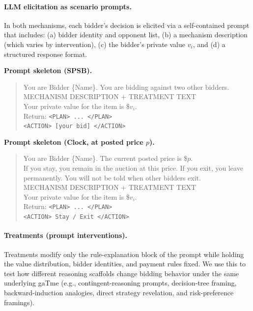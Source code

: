 \documentclass[format=acmsmall, review=false]{acmart}
\begin{document}
\paragraph{LLM elicitation as scenario prompts.}
In both mechanisms, each bidder’s decision is elicited via a self-contained prompt that includes: (a) bidder identity and opponent list, (b) a mechanism description (which varies by intervention), (c) the bidder’s private value $v_i$, and (d) a structured response format.

\vspace{.5cm}
\noindent\textbf{Prompt skeleton (SPSB).}
\begin{quote}\small
You are Bidder \{Name\}. You are bidding against two other bidders.\\
MECHANISM DESCRIPTION + TREATMENT TEXT\\
Your private value for the item is \${$v_i$}.\\
Return:
\texttt{<PLAN> ... </PLAN>}\\
\texttt{<ACTION> [your bid] </ACTION>}
\end{quote}

\noindent\textbf{Prompt skeleton (Clock, at posted price $p$).}
\begin{quote}\small
You are Bidder \{Name\}. The current posted price is \${$p$}.\\
If you stay, you remain in the auction at this price. If you exit, you leave permanently.
You will not be told when other bidders exit.\\
MECHANISM DESCRIPTION + TREATMENT TEXT\\
Your private value for the item is \${$v_i$}.\\
Return:
\texttt{<PLAN> ... </PLAN>}\\
\texttt{<ACTION> Stay / Exit </ACTION>}
\end{quote}


\paragraph{Treatments (prompt interventions).}
Treatments modify only the rule-explanation block of the prompt while holding the value distribution, bidder identities, and payment rules fixed. We use this to test how different reasoning scaffolds change bidding behavior under the same underlying gaTme (e.g., contingent-reasoning prompts, decision-tree framing, backward-induction analogies, direct strategy revelation, and risk-preference framings).
\end{document}
